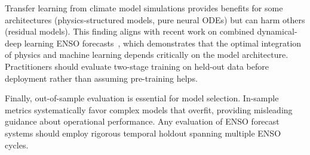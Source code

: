 Transfer learning from climate model simulations provides benefits for some architectures (physics-structured models, pure neural ODEs) but can harm others (residual models). This finding aligns with recent work on combined dynamical-deep learning ENSO forecasts~\cite{wang2025combined}, which demonstrates that the optimal integration of physics and machine learning depends critically on the model architecture. Practitioners should evaluate two-stage training on held-out data before deployment rather than assuming pre-training helps.

Finally, out-of-sample evaluation is essential for model selection. In-sample metrics systematically favor complex models that overfit, providing misleading guidance about operational performance. Any evaluation of ENSO forecast systems should employ rigorous temporal holdout spanning multiple ENSO cycles.
